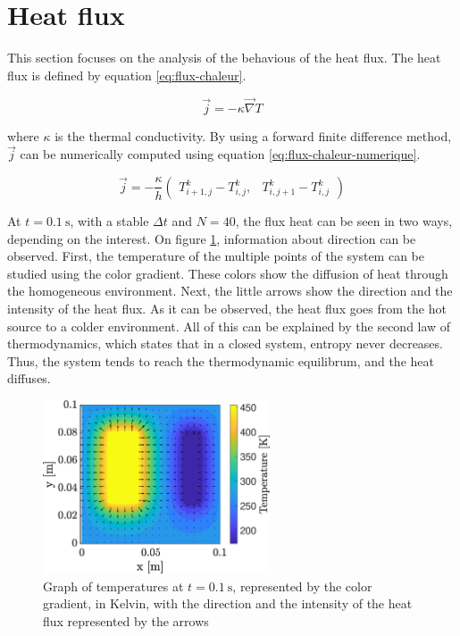 \documentclass[a4paper,12pt,twoside]{article}
\begin{document}
\section{Heat flux}
This section focuses on the analysis of the behavious of the heat flux.
The heat flux is defined by equation \eqref{eq:flux-chaleur}.

\begin{equation}
  \vec{j} = -\kappa\vec{\nabla} T
  \label{eq:flux-chaleur}
\end{equation}

where $\kappa$ is the thermal conductivity.
By using a forward finite difference method, $\vec{j}$ can be numerically computed using equation \eqref{eq:flux-chaleur-numerique}.

\begin{equation}
  \vec{j} = -\frac{\kappa}{h}
  \begin{pmatrix}
    T^k_{i+1,j} - T^k_{i,j}, & T^k_{i,j+1} - T^k_{i,j}
  \end{pmatrix}
  \label{eq:flux-chaleur-numerique}
\end{equation}

At $t=\SI{0.1}{\s}$, with a stable $\Delta t$ and $N=40$, the flux heat can be seen in two ways, depending on the interest.
On figure \ref{fig:c-temp}, information about direction can be observed.
First, the temperature of the multiple points of the system can be studied using the color gradient.
These colors show the diffusion of heat through the homogeneous environment.
Next, the little arrows show the direction and the intensity of the heat flux.
As it can be observed, the heat flux goes from the hot source to a colder environment.
All of this can be explained by the second law of thermodynamics, which states that in a closed system, entropy never decreases. \cite{wiki:2nd-law}
Thus, the system tends to reach the thermodynamic equilibrum, and the heat diffuses.

\begin{figure}[h]
  \centering
  \includegraphics[width=0.6\textwidth]{graphs/c_temp.eps}
  \caption{Graph of temperatures at $t=\SI{0.1}{\s}$, represented by the color gradient, in Kelvin, with the direction and the intensity of the heat flux represented by the arrows}
  \label{fig:c-temp}
\end{figure}
\end{document}

